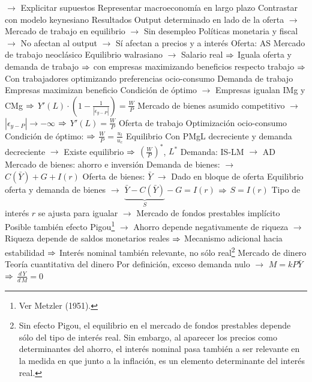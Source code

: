 \documentclass{nuevotema}
\begin{document}
\begin{esquemal}
				\4[] $\to$ Explicitar supuestos
				\4[] Representar macroeconomía en  largo plazo
				\4[] Contrastar con modelo keynesiano
				\4 Resultados
				\4[] Output determinado en lado de la oferta
				\4[] $\to$ Mercado de trabajo en equilibrio
				\4[] $\to$ Sin desempleo
				\4[] Políticas monetaria y fiscal
				\4[] $\to$ No afectan al output
				\4[] $\to$ Sí afectan a precios y a interés
			\3 Oferta: AS
				\4 Mercado de trabajo neoclásico
				\4[] Equilibrio walrasiano
				\4[] $\to$ Salario real
				\4[] $\Rightarrow$ Iguala oferta y demanda de trabajo
				\4[] $\Rightarrow$ con empresas maximizando beneficios respecto trabajo
				\4[] $\Rightarrow$ Con trabajadores optimizando preferencias ocio-consumo
				\4 Demanda de trabajo
				\4[] Empresas maximizan beneficio
				\4[] Condición de óptimo
				\4[] $\to$ Empresas igualan IMg y CMg
				\4[] $\Rightarrow$ $Y'(L) \cdot (1 - \frac{1}{| \epsilon_{y-P}|}) = \frac{W}{P}$
				\4[] Mercado de bienes asumido competitivo
				\4[] $\to$ $| \epsilon_{y-P} | \to -\infty$
				\4[] $\Rightarrow$ $Y'(L) = \frac{W}{P}$
				\4 Oferta de trabajo
				\4[] Optimización ocio-consumo
				\4[] Condición de óptimo:
				\4[] $\Rightarrow$ $\frac{W}{P} = \frac{u_l}{u_c}$
				\4 Equilibrio
				\4[] Con PMgL decreciente y demanda decreciente
				\4[] $\to$ Existe equilibrio
				\4[] $\Rightarrow$ $\left( \frac{W}{P}\right)^*$, $L^*$
			\3 Demanda: IS-LM $\to$ AD
				\4[IS] Mercado de bienes: ahorro e inversión
				\4[] Demanda de bienes:
				\4[] $\to$ $C(\bar{Y}) + G + I(r)$
				\4[] Oferta de bienes:
				\4[] $\bar{Y}$
				\4[] $\to$ Dado en bloque de oferta
				\4[] Equilibrio oferta y demanda de bienes
				\4[] $\to$ $\underbrace{\bar{Y} - C(\bar{Y})}_{S} -G = I(r)$
				\4[] $\Rightarrow$ $S = I(r)$
				\4[] Tipo de interés $r$ se ajusta para igualar
				\4[] $\to$ Mercado de fondos prestables implícito
				\4[] Posible también efecto Pigou\footnote{Ver Metzler (1951).}
				\4[] $\to$ Ahorro depende negativamente de riqueza
				\4[] $\to$ Riqueza depende de saldos monetarios reales
				\4[] $\Rightarrow$ Mecanismo adicional hacia estabilidad
				\4[] $\Rightarrow$ Interés nominal también relevante, no sólo real\footnote{Sin efecto Pigou, el equilibrio en el mercado de fondos prestables depende sólo del tipo de interés real. Sin embargo, al aparecer los precios como determinantes del ahorro, el interés nominal pasa también a ser relevante en la medida en que junto a la inflación, es un elemento determinante del interés real.}
				\4[LM] Mercado de dinero
				\4[] Teoría cuantitativa del dinero
				\4[] Por definición, exceso demanda nulo
				\4[] $\to$ $M = k P \bar{Y}$
				\4[] $\Rightarrow$ $\frac{d \, Y}{d \, M} = 0$

\end{esquemal}
\end{document}
